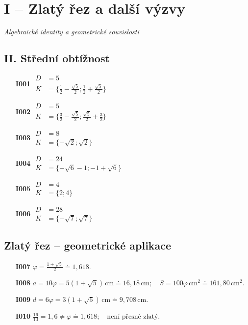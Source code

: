 \documentclass[11pt,a4paper]{article}
\begin{document}
\section*{I -- Zlatý řez a další výzvy}
\textit{Algebraické identity a geometrické souvislosti}
\subsection*{II. Střední obtížnost}
\begin{enumerate}[label={},itemsep=9pt]
\item[\textbf{I001}] \(\displaystyle \begin{aligned}D&=5\\K&=\{\frac{1}{2} - \frac{\sqrt{5}}{2};\frac{1}{2} + \frac{\sqrt{5}}{2}\}\end{aligned}\)\par
\item[\textbf{I002}] \(\displaystyle \begin{aligned}D&=5\\K&=\{\frac{3}{2} - \frac{\sqrt{5}}{2};\frac{\sqrt{5}}{2} + \frac{3}{2}\}\end{aligned}\)\par
\item[\textbf{I003}] \(\displaystyle \begin{aligned}D&=8\\K&=\{- \sqrt{2};\sqrt{2}\}\end{aligned}\)\par
\item[\textbf{I004}] \(\displaystyle \begin{aligned}D&=24\\K&=\{- \sqrt{6} - 1;-1 + \sqrt{6}\}\end{aligned}\)\par
\item[\textbf{I005}] \(\displaystyle \begin{aligned}D&=4\\K&=\{2;4\}\end{aligned}\)\par
\item[\textbf{I006}] \(\displaystyle \begin{aligned}D&=28\\K&=\{- \sqrt{7};\sqrt{7}\}\end{aligned}\)\par
\end{enumerate}
\subsection*{Zlatý řez -- geometrické aplikace}
\begin{enumerate}[label={},itemsep=8pt]
\item[\textbf{I007}] $\varphi=\frac{1+\sqrt5}{2}\doteq1{,}618.$
\item[\textbf{I008}] $a=10\varphi=5(1+\sqrt5)\,\mathrm{cm}\doteq16{,}18\,\mathrm{cm};\quad S=100\varphi\,\mathrm{cm}^2\doteq161{,}80\,\mathrm{cm}^2.$
\item[\textbf{I009}] $d=6\varphi=3(1+\sqrt5)\,\mathrm{cm}\doteq9{,}708\,\mathrm{cm}.$
\item[\textbf{I010}] $\frac{16}{10}=1{,}6\ne\varphi\doteq1{,}618;\quad\text{není přesně zlatý}.$
\end{enumerate}
\end{document}
